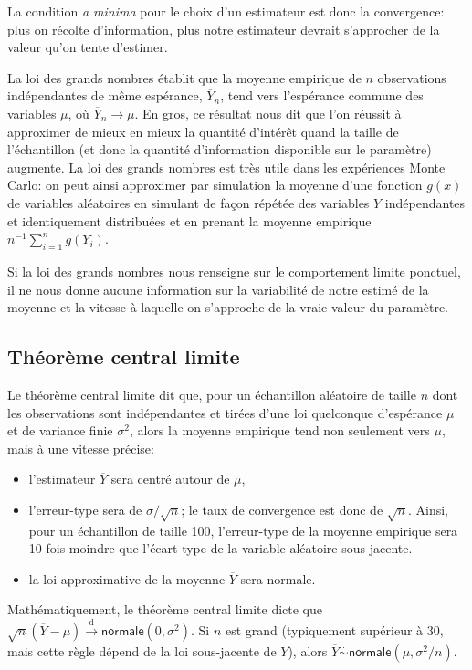 \documentclass[
  11pt,
  letterpaper,
]{scrbook}
\providecommand{\tightlist}{%
  \setlength{\itemsep}{0pt}\setlength{\parskip}{0pt}}\usepackage{longtable,booktabs,array}
\theoremstyle{definition}
\theoremstyle{definition}
\theoremstyle{remark}
\begin{document}
La condition \emph{a minima} pour le choix d'un estimateur est donc la
convergence: plus on récolte d'information, plus notre estimateur
devrait s'approcher de la valeur qu'on tente d'estimer.

La loi des grands nombres établit que la moyenne empirique de \(n\)
observations indépendantes de même espérance, \(\overline{Y}_n\), tend
vers l'espérance commune des variables \(\mu\), où
\(\overline{Y}_n \rightarrow \mu\). En gros, ce résultat nous dit que
l'on réussit à approximer de mieux en mieux la quantité d'intérêt quand
la taille de l'échantillon (et donc la quantité d'information disponible
sur le paramètre) augmente. La loi des grands nombres est très utile
dans les expériences Monte Carlo: on peut ainsi approximer par
simulation la moyenne d'une fonction \(g(x)\) de variables aléatoires en
simulant de façon répétée des variables \(Y\) indépendantes et
identiquement distribuées et en prenant la moyenne empirique
\(n^{-1} \sum_{i=1}^n g(Y_i)\).

Si la loi des grands nombres nous renseigne sur le comportement limite
ponctuel, il ne nous donne aucune information sur la variabilité de
notre estimé de la moyenne et la vitesse à laquelle on s'approche de la
vraie valeur du paramètre.

\subsection{Théorème central limite}\label{TCL}

Le théorème central limite dit que, pour un échantillon aléatoire de
taille \(n\) dont les observations sont indépendantes et tirées d'une
loi quelconque d'espérance \(\mu\) et de variance finie \(\sigma^2\),
alors la moyenne empirique tend non seulement vers \(\mu\), mais à une
vitesse précise:

\begin{itemize}
\tightlist
\item
  l'estimateur \(\overline{Y}\) sera centré autour de \(\mu\),
\item
  l'erreur-type sera de \(\sigma/\sqrt{n}\); le taux de convergence est
  donc de \(\sqrt{n}\). Ainsi, pour un échantillon de taille 100,
  l'erreur-type de la moyenne empirique sera 10 fois moindre que
  l'écart-type de la variable aléatoire sous-jacente.
\item
  la loi approximative de la moyenne \(\overline{Y}\) sera normale.
\end{itemize}

Mathématiquement, le théorème central limite dicte que
\(\sqrt{n}(\overline{Y}-\mu) \stackrel{\mathrm{d}}{\rightarrow} \mathsf{normale}(0, \sigma^2)\).
Si \(n\) est grand (typiquement supérieur à \(30\), mais cette règle
dépend de la loi sous-jacente de \(Y\)), alors
\(\overline{Y} \stackrel{\cdot}{\sim} \mathsf{normale}(\mu, \sigma^2/n)\).
\end{document}
